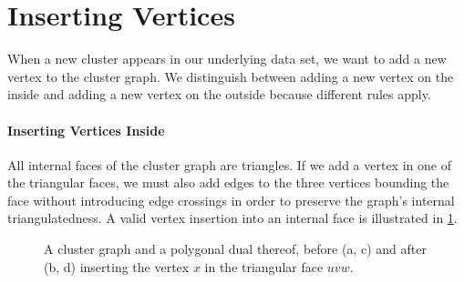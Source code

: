 \section{Inserting Vertices}
\label{sect:inserting-vertices}

When a new cluster appears in our underlying data set, we want to add a new vertex to the cluster graph. We distinguish between adding a new vertex on the inside and adding a new vertex on the outside because different rules apply.



\paragraph{Inserting Vertices Inside}

All internal faces of the cluster graph are triangles. If we add a vertex in one of the triangular faces, we must also add edges to the three vertices bounding the face without introducing edge crossings in order to preserve the graph's internal triangulatedness. A valid vertex insertion into an internal face is illustrated in \cref{fig:insert-vertex-example-inside}.

\begin{figure}[H]
	\centering
	\quad
	\qquad
	\quad
	\caption{A cluster graph and a polygonal dual thereof, before (a, c) and after (b, d) inserting the vertex $x$ in the triangular face $uvw$.}
	\label{fig:insert-vertex-example-inside}
\end{figure}

